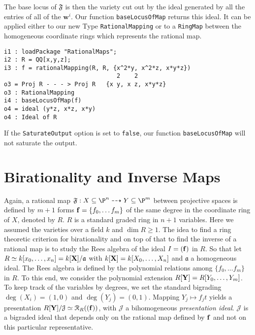 \documentclass[11pt]{amsart}%
\numberwithin{equation}{theorem}
\def\ff{{\bf f}}
\def\XX{{\bf X}}
\def\YY{{\bf Y}}
\renewcommand{\:}{\colon}
\theoremstyle{theorem}
\begin{document}
The base locus of $\mathfrak{F}$ is then the variety cut out by the ideal generated by all the entries of all of the $\mathbf w^i$. Our function {\tt baseLocusOfMap}  returns this ideal.  It can be applied either to our new Type {\tt RationalMapping} or to a {\tt RingMap} between the homogeneous coordinate rings which represents the rational map.
{\scriptsize\color{blue}
\begin{verbatim}
i1 : loadPackage "RationalMaps";
i2 : R = QQ[x,y,z];    
i3 : f = rationalMapping(R, R, {x^2*y, x^2*z, x*y*z})    
                                2    2
o3 = Proj R - - - > Proj R   {x y, x z, x*y*z}    
o3 : RationalMapping    
i4 : baseLocusOfMap(f)    
o4 = ideal (y*z, x*z, x*y)    
o4 : Ideal of R    
\end{verbatim}
}
{\normalsize}
If the \verb=SaturateOutput= option is set  to {\tt false}, our function {\tt baseLocusOfMap} will not saturate the output.


\section{Birationality and Inverse Maps}

Again, a rational map $\mathfrak{F}:X\subseteq \P^n\dasharrow Y \subseteq \P^m$ between projective spaces is defined by $m+1$ forms $\ff=\{f_0,\ldots f_m\}$ of the same degree in the coordinate ring of $X$, denoted by  $R$. $R$ is a standard graded ring in $n+1$ variables. Here we assumed the varieties over a field $k$ and  $\dim R\geq 1$.
The idea to find a ring theoretic criterion for birationality and on top of that to find the inverse of a rational map is to study the Rees algebra of the ideal $I=(\ff)$ in $R$.
So that let  $R\simeq k[x_0,\ldots, x_n]=k[\XX]/\mathfrak{a}$ with $k[\XX]=k[X_0,\ldots, X_n]$ and $\mathfrak{a}$ a homogeneous ideal. The Rees algebra is defined by the polynomial relations among $\{f_0,\ldots f_m\}$ in $R$. To this end, we consider the polynomial extension $R[\YY]=R[Y_0,\ldots,Y_m]$. To keep track of the variables by degrees, we set the standard  bigrading $\deg(X_i)=(1,0)$ and $\deg(Y_j)=(0,1)$. Mapping $Y_j\mapsto f_jt$ yields
a presentation $R[\YY]/\mathcal{J}\simeq {\mathcal R}_R((\ff))$, with $\mathcal{J}$ a bihomogeneous {\em presentation
ideal}.
$\mathcal{J}$ is a bigraded ideal that depends only on the rational map defined by $\ff$
and not on this particular representative.
\end{document}
